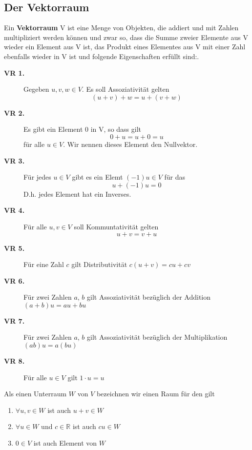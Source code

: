 \subsection{Der Vektorraum}
Ein {\bf Vektorraum} V ist eine Menge von Objekten, die addiert und mit Zahlen
multipliziert werden können und zwar so, dass die Summe zweier Elemente aus V
wieder ein Element aus V ist, das Produkt eines Elementes aus V mit einer Zahl
ebenfalls wieder in V ist und folgende Eigenschaften erfüllt sind:.
\begin{description}
  \item[{\bf VR 1.}] Gegeben $u,v,w\in V$. Es soll Assoziativität gelten
    \[ (u+v)+w = u+(v+w) \] 
  \item[{\bf VR 2.}] Es gibt ein Element 0 in V, so dass gilt
    \[ 0+u = u+0 =u \]
    für alle $u\in V$. Wir nennen dieses Element den Nullvektor.
  \item[{\bf VR 3.}] Für jedes $u\in V$ gibt es ein Elemt $(-1)u\in V$ für das 
  \[ u+(-1)u=0 \]
    D.h. jedes Element hat ein Inverses.
  \item[{\bf VR 4.}] Für alle $u,v\in V$ soll Kommuntativität gelten
    \[ u+v = v+u \]
  \item[{\bf VR 5.}] Für eine Zahl $c$ gilt Distributivität $c(u+v)=cu+cv$ 
  \item[{\bf VR 6.}] Für zwei Zahlen $a$, $b$ gilt Assoziativität bezüglich der Addition $(a+b)u=au+bu$
  \item[{\bf VR 7.}] Für zwei Zahlen $a$, $b$ gilt Assoziativität bezüglich der Multiplikation $(ab)u=a(bu)$
  \item[{\bf VR 8.}] Für alle $u\in V$ gilt $1\cdot u=u$
\end{description}
Als einen Unterraum $W$ von $V$ bezeichnen wir einen Raum für den gilt
\begin{enumerate}
  \item $\forall u,v\in W$ ist auch $u+v\in W$
  \item $\forall u\in W$ und $c\in\mathbb{R}$ ist auch $cu\in W$
  \item $0\in V$ ist auch Element von $W$ 
\end{enumerate}
